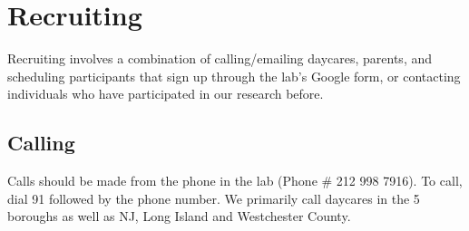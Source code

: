 \documentclass[
]{book}
\begin{document}
\hypertarget{recruiting}{%
\section{Recruiting}\label{recruiting}}

Recruiting involves a combination of calling/emailing daycares, parents, and scheduling participants that sign up through the lab's Google form, or contacting individuals who have participated in our research before.

\hypertarget{calling}{%
\subsection*{Calling}\label{calling}}

Calls should be made from the phone in the lab (Phone \# 212 998 7916). To call, dial 91 followed by the phone number. We primarily call daycares in the 5 boroughs as well as NJ, Long Island and Westchester County.
\end{document}
